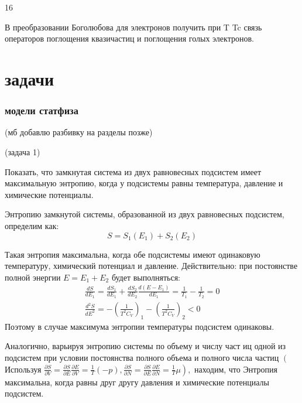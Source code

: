 \documentclass[a4paper,12pt]{article} %
\begin{document}
\begin{task}

16




\end{task}


\begin{task}

В преобразовании Боголюбова для электронов получить при T  Tc связь операторов поглощения квазичастиц и поглощения голых электронов.


\end{task}




\clearpage
\part{задачи}

\section{модели статфиза}

(мб добавлю разбивку на разделы позже)

\begin{task}
(задача 1)

Показать, что замкнутая система из двух равновесных подсистем имеет максимальную энтропию, 
когда у подсистемы равны температура, давление и химические потенциалы.


Энтропию замкнутой системы, образованной из двух равновесных подсистем, определим как:
$$
S=S_{1}\left(E_{1}\right)+S_{2}\left(E_{2}\right)
$$


Такая энтропия максимальна, когда обе подсистемы имеют одинаковую температуру, химический потенциал и давление.
Действительно:
при постоянстве полной энергии $E=E_{1}+E_{2}$ будет выполняться:
{\Large $$
	\begin{array}{c}
	\frac{d S}{d E_{1}}=\frac{d S_{1}}{d E_{1}}+\frac{d S_{2}}{d E_{2}} \frac{d\left(E-E_{1}\right)}{d E_{1}}=\frac{1}{T_{1}}-\frac{1}{T_{2}}=0 \\
	\frac{d^{2} S}{d E^{2}}=-\left(\frac{1}{T^{2} C_{V}}\right)_{1}-\left(\frac{1}{T^{2} C_{V}}\right)_{2}<0
	\end{array}
	$$}
Поэтому в случае максимума энтропии температуры подсистем одинаковы.

Аналогично, варьируя энтропию системы по объему и числу част иц одной из подсистем при условии постоянства полного объема и полного числа частиц 
$\left(\right.$ Используя $\left.\frac{\partial S}{\partial V}=
\frac{\partial S}{\partial E} \frac{\partial E}{\partial V}=\frac{1}{T}(-p), \frac{\partial S}{\partial N}=
\frac{\partial S}{\partial E} \frac{\partial E}{\partial N}=
\frac{1}{T} \mu\right),$ находим, что Энтропия
максимальна, когда равны друг другу давления и химические потенциалы подсистем.



\end{task}
\end{document}
